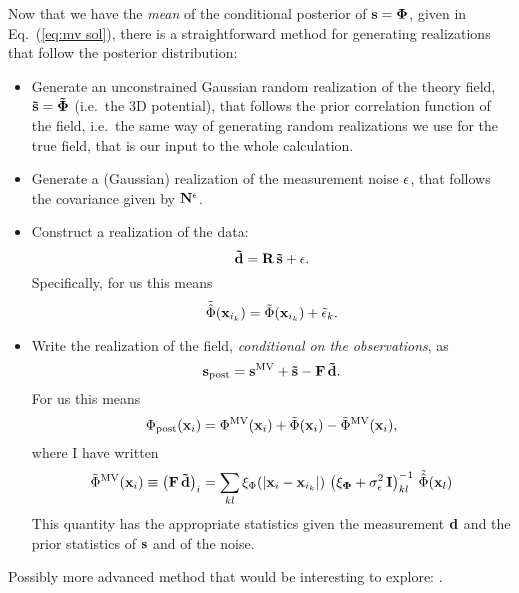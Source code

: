 \documentclass[prd, onecolumn, nofootinbib, floatfix]{revtex4-1}
\newcommand{\be}{\begin{equation}}
\newcommand{\ee}{\end{equation}}
\begin{document}
Now that we have the {\it mean} of the conditional posterior of ${\bf s} = {\bf \Phi}$, given in Eq.~(\ref{eq:mv sol}), there is a straightforward
method for generating realizations that follow the posterior distribution:
\begin{itemize}
\item
Generate an unconstrained Gaussian random realization of the theory field, ${\bf \tilde{s}} = {\bf \tilde{\Phi}}$ (i.e.~the 3D potential), that follows the prior
correlation function of the field, i.e.~the same way of generating random realizations we use for the true field, that is our
input to the whole calculation.
\item
Generate a (Gaussian) realization of the measurement noise ${\bf \epsilon}$, that follows the covariance
given by ${\bf N^{\epsilon}}$.
\item
Construct a realization of the data:
\be
{\bf \tilde{d}} = {\bf R} \, {\bf \tilde{s}} + {\bf \epsilon}.
\ee
Specifically, for us this means
\be
\tilde{\hat{\Phi}}({\bf x}_{i_k}) = \tilde{\Phi}({\bf x}_{i_k}) + \tilde{\epsilon}_k.
\ee
\item
Write the realization of the field, {\it conditional on the observations}, as
\be
{\bf s}_{\rm post} = {\bf s}^{\rm MV} + {\bf \tilde{s}} - {\bf F} \, {\bf \tilde{d}}.
\ee
For us this means
\be
\Phi_{\rm post}({\bf x}_i) = \Phi^{\rm MV}({\bf x}_i) + \tilde{\Phi}({\bf x}_i) - \tilde{\Phi}^{\rm MV}({\bf x}_i),
\ee
where I have written
\be
\tilde{\Phi}^{\rm MV}({\bf x}_i) \equiv \left({\bf F} \, {\bf \tilde{d}}\right)_i = \sum_{kl}  \xi_\Phi(|{\bf x}_{i} - {\bf x}_{i_k}|) \, \left({\bf \xi_\Phi} + \sigma^2_\epsilon \, {\bf I}\right)^{-1}_{kl} \, \tilde{\hat{\Phi}}({\bf x}_l)
\ee
This quantity has the appropriate statistics given the measurement ${\bf d}$ and
the prior statistics of ${\bf s}$ and of the noise.
\end{itemize}

Possibly more advanced method that would be interesting to explore: \cite{jaslav15}.


\end{document}

